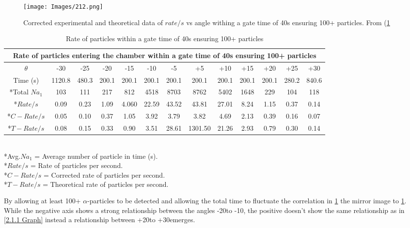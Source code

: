 \documentclass[12pt]{article}
\begin{document}
\begin{figure}[H]
\centering
\texttt{[image: Images/212.png]}
\caption{Corrected experimental and theoretical data of $rate/s$ vs angle withing a gate time of 40s ensuring 100+ particles. From (\cref{Rate of particles within a gate time of 40s ensuring 100+ particles table}}
\label{2.1.2 Graph}
\end{figure}

\begin{table}[H]
\begin{center}
 \footnotesize
 \begin{tabular}{|c||c|c|c|c|c|c||c|c|c|c|c|c|}
 \hline
 \multicolumn{13}{|c|}{Rate of particles entering the chamber within a gate time of 40s ensuring 100+ particles} \\
 \hline \hline
 $\theta$ & -30 & -25 & -20 & -15 & -10 & -5 & +5 & +10 & +15 & +20 & +25 & +30 \\
 \hline \hline
 Time (s) & 1120.8 & 480.3 & 200.1 & 200.1 & 200.1 & 200.1 & 200.1 & 200.1 & 200.1 & 200.1 & 280.2 & 840.6\\
 \hline
 *Total $Na_1$ & 103 & 111 & 217 & 812 & 4518 & 8703 & 8762 & 5402 & 1648 & 229 & 104 & 118 \\
 \hline
 *$Rate/s$ & 0.09 & 0.23 & 1.09 & 4.060 & 22.59 & 43.52 & 43.81 & 27.01 & 8.24 & 1.15 & 0.37 & 0.14 \\
 \hline \hline
 *$C-Rate/s$ & 0.05 & 0.10 & 0.37 & 1.05 & 3.92 & 3.79 & 3.82 & 4.69 & 2.13 & 0.39 & 0.16 & 0.07  \\
 \hline
 *$T-Rate/s$ & 0.08 & 0.15 & 0.33 & 0.90 & 3.51 & 28.61 & 1301.50 & 21.26 & 2.93 & 0.79 & 0.30 & 0.14 \\
 \hline
 \end{tabular} \\ [0.2cm]
 *Avg.$Na_1$ = Average number of particle in time (s). \\
 *$Rate/s$ = Rate of particles per second. \\
 *$C-Rate/s$ = Corrected rate of particles per second. \\
 *$T-Rate/s$ = Theoretical rate of particles per second.
 \caption{Rate of particles within a gate time of 40s ensuring 100+ particles}
 \label{Rate of particles within a gate time of 40s ensuring 100+ particles table}
\end{center}
\end{table}

By allowing at least 100+ $\alpha$-particles to be detected and allowing the total time to fluctuate the correlation in \cref{2.1.2 Graph} the mirror image to \cref{2.1.2 Graph}. While the negative axis shows a strong relationship between the angles -20\textdegree to -10\textdegree, the positive doesn't show the same relationship as in \cref{2.1.1 Graph} instead a relationship between +20\textdegree to +30\textdegree emerges. \\
\end{document}
